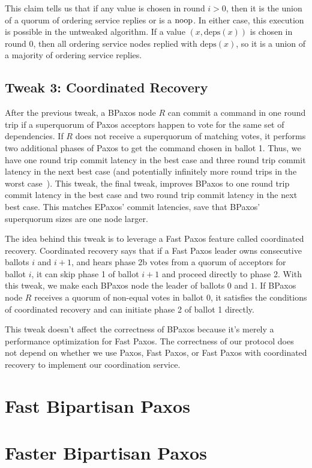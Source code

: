 \documentclass{mwhittaker}
\theoremstyle{definition}
\newcommand{\deps}[1]{\text{deps}(#1)}
\begin{document}
This claim tells us that if any value is chosen in round $i > 0$, then it is
the union of a quorum of ordering service replies or is a $\text{noop}$. In either
case, this execution is possible in the untweaked algorithm. If a value $(x,
\deps{x})$ is chosen in round $0$, then all ordering service nodes replied with
$\deps{x}$, so it is a union of a majority of ordering service replies.

\subsection{Tweak 3: Coordinated Recovery}
After the previous tweak, a BPaxos node $R$ can commit a command in one round
trip if a superquorum of Paxos acceptors happen to vote for the same set of
dependencies. If $R$ does not receive a superquorum of matching votes, it
performs two additional phases of Paxos to get the command chosen in ballot 1.
Thus, we have one round trip commit latency in the best case and three round
trip commit latency in the next best case (and potentially infinitely more
round trips in the worst case~\cite{fischer1982impossibility}). This tweak, the
final tweak, improves BPaxos to one round trip commit latency in the best case
and two round trip commit latency in the next best case. This matches EPaxos'
commit latencies, save that BPaxos' superquorum sizes are one node larger.

The idea behind this tweak is to leverage a Fast Paxos feature called
coordinated recovery. Coordinated recovery says that if a Fast Paxos leader
owns consecutive ballots $i$ and $i + 1$, and hears phase 2b votes from a
quorum of acceptors for ballot $i$, it can skip phase 1 of ballot $i + 1$ and
proceed directly to phase 2. With this tweak, we make each BPaxos node the
leader of ballots $0$ and $1$. If BPaxos node $R$ receives a quorum of
non-equal votes in ballot $0$, it satisfies the conditions of coordinated
recovery and can initiate phase 2 of ballot 1 directly.

This tweak doesn't affect the correctness of BPaxos because it's merely a
performance optimization for Fast Paxos. The correctness of our protocol does
not depend on whether we use Paxos, Fast Paxos, or Fast Paxos with coordinated
recovery to implement our coordination service.

\section{Fast Bipartisan Paxos}
\section{Faster Bipartisan Paxos}
\end{document}
